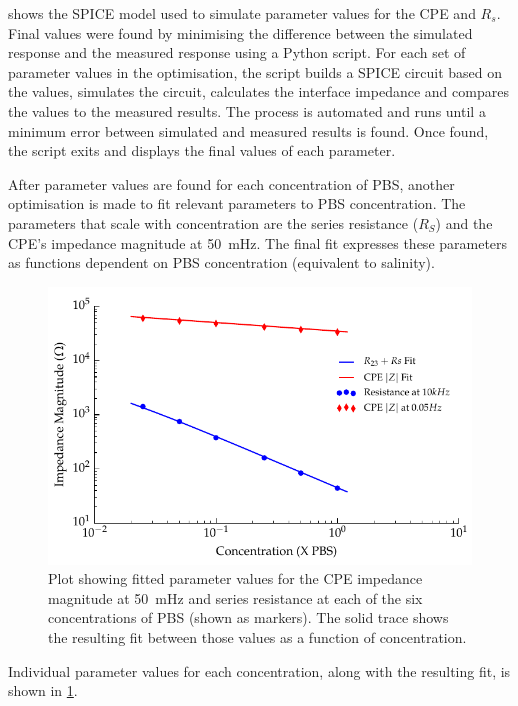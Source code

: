        shows the SPICE model used to simulate parameter values for the CPE and $R_{s}$.
      Final values were found by minimising the difference between the simulated response and the measured response using a Python script.
      For each set of parameter values in the optimisation, the script builds a SPICE circuit based on the values, simulates the circuit, calculates the interface impedance and compares the values to the measured results.
      The process is automated and runs until a minimum error between simulated and measured results is found.
      Once found, the script exits and displays the final values of each parameter.

      After parameter values are found for each concentration of PBS, another optimisation is made to fit relevant parameters to PBS concentration.
      The parameters that scale with concentration are the series resistance ($R_{S}$) and the CPE's impedance magnitude at \SI{50}{\milli\hertz}.
      The final fit expresses these parameters as functions dependent on PBS concentration (equivalent to salinity).
      \begin{figure}
        \centering
        \includegraphics{content/pt2/08-InterfaceParameters/graphics/scalingFactors_Displacement_Thesis}
        \caption{\label{fig:pt2-scalingFactors_Displacement_Thesis}Plot showing fitted parameter values for the CPE impedance magnitude at \SI{50}{\milli\hertz} and series resistance at each of the six concentrations of PBS (shown as markers). The solid trace shows the resulting fit between those values as a function of concentration.}
      \end{figure}
      Individual parameter values for each concentration, along with the resulting fit, is shown in \cref{fig:pt2-scalingFactors_Displacement_Thesis}.
